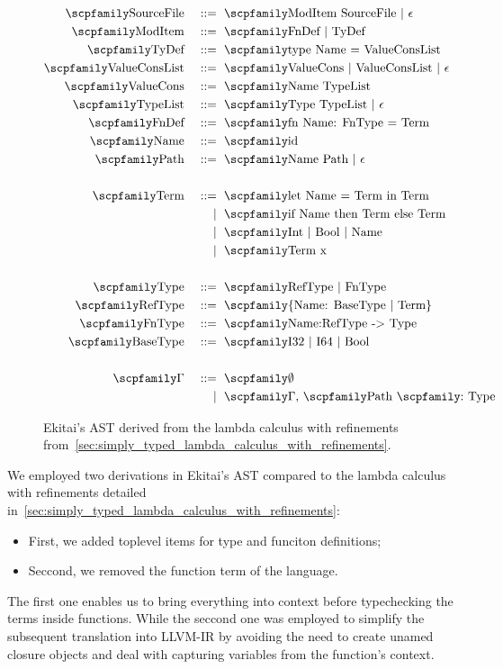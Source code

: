 \documentclass[
  oneside,
  english,
  coorientadorbanca,
  noabntexcite
]{ufsc-thesis-rn46-2019}
\def\bnfdef{::=}
\newcommand{\codett}[1]{\text{\scpfamily#1}}
\newcommand{\code}[1]{\text{\scpfamily\setlength\spaceskip{0.35em}#1}}
\newcommand{\bnfor}[1]{{$\mid$} #1}
\newcommand{\bnfmore}[1]{            & \ & \mid{}    & \ \code{#1}}
\newcommand{\astprod}[2]{\code{#1} & \ & \bnfdef{} & \ \code{#2}}
\newcommand{\astmore}[1]{\bnfmore{#1}}
\newcommand{\typer}[2]{\code{#1 \codett{:} #2}}
\begin{document}
\begin{figure}[!htb]
  \begin{alignat*}{2}
    \astprod{SourceFile}{ModItem SourceFile \bnfor{$\epsilon$}}           \\
    \astprod{ModItem}{FnDef \bnfor{TyDef}}                                \\
    \astprod{TyDef}{type Name = ValueConsList}                            \\
    \astprod{ValueConsList}{ValueCons | ValueConsList \bnfor{$\epsilon$}} \\
    \astprod{ValueCons}{Name TypeList}                                    \\
    \astprod{TypeList}{Type TypeList \bnfor{$\epsilon$}}                  \\
    \astprod{FnDef}{fn Name: FnType = Term}                               \\
    \astprod{Name}{id} \\
    \astprod{Path}{Name Path \bnfor{$\epsilon$}} \\
\\
    \astprod{Term}{let Name = Term in Term} \\
    \astmore{if Name then Term else Term}   \\
    \astmore{Int \bnfor{Bool} \bnfor{Name}} \\
    \astmore{Term x}                        \\
\\
    \astprod{Type}{RefType \bnfor{FnType}}       \\
    \astprod{RefType}{\{Name: BaseType | Term\}} \\
    \astprod{FnType}{Name:RefType -> Type}       \\
    \astprod{BaseType}{I32 \bnfor{I64} \bnfor{Bool}} \\
\\
    \astprod{$\Gamma$}{$\emptyset$}        \\
    \astmore{$\Gamma$, \typer{Path}{Type}}    
  \end{alignat*}
  \caption{
    Ekitai's AST derived from the lambda calculus with refinements from~\cref{sec:simply_typed_lambda_calculus_with_refinements}.
  }\label{fig:ekitai_ast}
\end{figure}

We employed two derivations in Ekitai's AST compared to the lambda calculus with refinements detailed in~\cref{sec:simply_typed_lambda_calculus_with_refinements}:
\begin{itemize}
  \item First, we added toplevel items for type and funciton definitions;
  \item Seccond, we removed the function term of the language.
\end{itemize}
The first one enables us to bring everything into context before typechecking the terms inside functions.
While the seccond one was employed to simplify the subsequent translation into LLVM-IR by avoiding the need to create unamed closure objects and deal with capturing variables from the function's context.  
\end{document}
